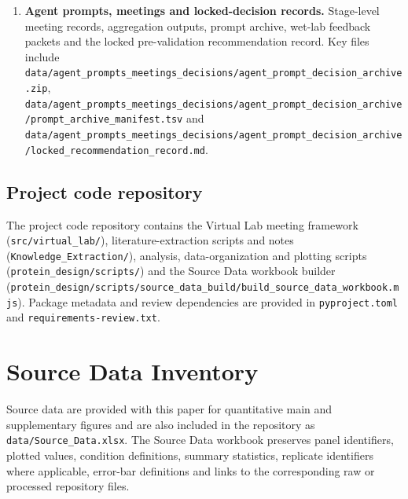 \begin{enumerate}
  \item \textbf{Agent prompts, meetings and locked-decision records.}
  Stage-level meeting records, aggregation outputs, prompt archive, wet-lab
  feedback packets and the locked pre-validation recommendation record. Key
  files include
  \nolinkurl{data/agent_prompts_meetings_decisions/agent_prompt_decision_archive.zip},
  \nolinkurl{data/agent_prompts_meetings_decisions/agent_prompt_decision_archive/prompt_archive_manifest.tsv}
  and
  \nolinkurl{data/agent_prompts_meetings_decisions/agent_prompt_decision_archive/locked_recommendation_record.md}.
\end{enumerate}

\subsection*{Project code repository}

The project code repository contains the Virtual Lab meeting framework
(\nolinkurl{src/virtual_lab/}), literature-extraction scripts and notes
(\nolinkurl{Knowledge_Extraction/}), analysis, data-organization and plotting
scripts (\nolinkurl{protein_design/scripts/}) and the Source Data workbook
builder
(\nolinkurl{protein_design/scripts/source_data_build/build_source_data_workbook.mjs}).
Package metadata and review dependencies are provided in
\nolinkurl{pyproject.toml} and \nolinkurl{requirements-review.txt}.

\section*{Source Data Inventory}

Source data are provided with this paper for quantitative main and
supplementary figures and are also included in the repository as
\nolinkurl{data/Source_Data.xlsx}. The Source Data workbook preserves panel
identifiers, plotted values, condition definitions, summary statistics,
replicate identifiers where applicable, error-bar definitions and links to the
corresponding raw or processed repository files.

